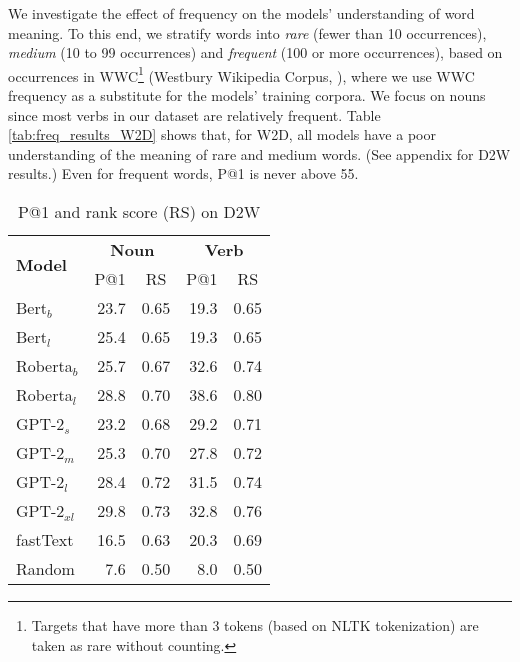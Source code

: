\documentclass[11pt,a4paper]{article}
\begin{document}

We investigate the effect of frequency on the models' understanding of word meaning.
To this end, we stratify words into \textit{rare} (fewer than 10 occurrences), \textit{medium} (10 to 99 occurrences) and \textit{frequent} (100 or more occurrences), based on occurrences in WWC\footnote{Targets that have more than 3 tokens (based on NLTK tokenization) are taken as rare without counting.} (Westbury Wikipedia Corpus, ), where we use WWC frequency as a substitute for the models' training corpora. 
We focus on nouns since most verbs in our dataset are relatively frequent. 
Table \ref{tab:freq_results_W2D} shows that, for W2D, all models have a poor understanding of the meaning of rare and medium words. (See appendix for D2W results.) 
Even for frequent words, P@1 is never above 55.

\begin{table}
    \centering
    \begin{tabular}{l|rrrr}
        \hline
         \multirow{2}{*}{\textbf{Model}} & \multicolumn{2}{c}{\textbf{Noun}} & \multicolumn{2}{c}{\textbf{Verb}} \\
         & \multicolumn{1}{c}{P@1} & \multicolumn{1}{c}{RS} & \multicolumn{1}{c}{P@1} & \multicolumn{1}{c}{RS} \\ \hline
     Bert$_{b}$ & 23.7 & 0.65 & 19.3 & 0.65 \\
     Bert$_{l}$ & 25.4 & 0.65 & 19.3 & 0.65 \\
     Roberta$_{b}$ & 25.7 & 0.67 & 32.6 & 0.74 \\
     Roberta$_{l}$ & 28.8 & 0.70 & 38.6 & 0.80 \\ \hline
     GPT-2$_{s}$ & 23.2 & 0.68 & 29.2 & 0.71 \\
     GPT-2$_{m}$ & 25.3 & 0.70 & 27.8 & 0.72 \\
     GPT-2$_{l}$ & 28.4 & 0.72 & 31.5 & 0.74 \\
     GPT-2$_{xl}$ & 29.8 & 0.73 & 32.8 & 0.76 \\ \hline 
     fastText & 16.5 & 0.63 & 20.3 & 0.69 \\ \hline 
     Random & 7.6 & 0.50 & 8.0 & 0.50 \\\hline
     
    \end{tabular}
    \caption{P@1 and rank score (RS) on D2W}
    \label{tab:results_D2W}
\end{table}
\end{document}
